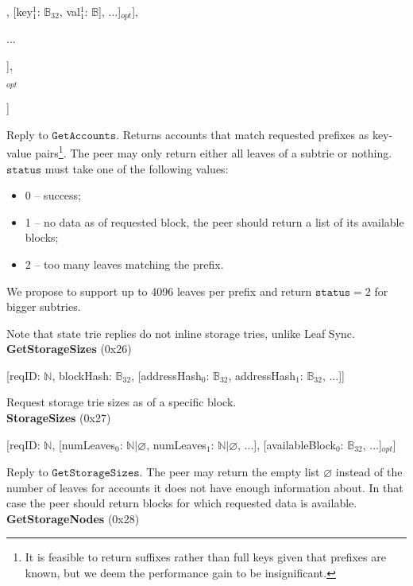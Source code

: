 \documentclass{amsart}
\begin{document}
\qquad [status$_1$: $\mathbb{N}$, [[key$^0_{1}$: $\mathbb{B}_{32}$, val$^0_{1}$: $\mathbb{B}$], [key$^1_{1}$: $\mathbb{B}_{32}$, val$^1_{1}$: $\mathbb{B}$], ...]$_{opt}$],

\qquad ...

\quad ],

$_{opt}$

]
\medskip

Reply to $\texttt{GetAccounts}$.
Returns accounts that match requested prefixes as key-value pairs\footnote{It
is feasible to return suffixes rather than full keys given that prefixes are known,
but we deem the performance gain to be insignificant.}.
The peer may only return either all leaves of a subtrie or nothing.
$\texttt{status}$ must take one of the following values:
\begin{itemize}
\item 0 -- success;
\item 1 -- no data as of requested block, the peer should return a list of its available blocks;
\item 2 -- too many leaves matching the prefix.
\end{itemize}
We propose to support up to 4096 leaves per prefix
and return $\texttt{status} = 2$ for bigger subtries.

Note that state trie replies do not inline storage tries, unlike Leaf Sync.\\

\textbf{GetStorageSizes} (0x26)

[reqID: $\mathbb{N}$, blockHash: $\mathbb{B}_{32}$,
[addressHash$_0$: $\mathbb{B}_{32}$, addressHash$_1$: $\mathbb{B}_{32}$, ...]]
\medskip

Request storage trie sizes as of a specific block.\\

\textbf{StorageSizes} (0x27)

[reqID: $\mathbb{N}$,
[numLeaves$_0$: $\mathbb{N} | \varnothing$, numLeaves$_1$: $\mathbb{N} | \varnothing$, ...],
[availableBlock$_0$: $\mathbb{B}_{32}$, ...]$_{opt}$]
\medskip

Reply to $\texttt{GetStorageSizes}$.
The peer may return the empty list $\varnothing$ instead of the number of leaves for accounts it does not have enough information about.
In that case the peer should return blocks for which requested data is available.\\

\textbf{GetStorageNodes} (0x28)
\end{document}
